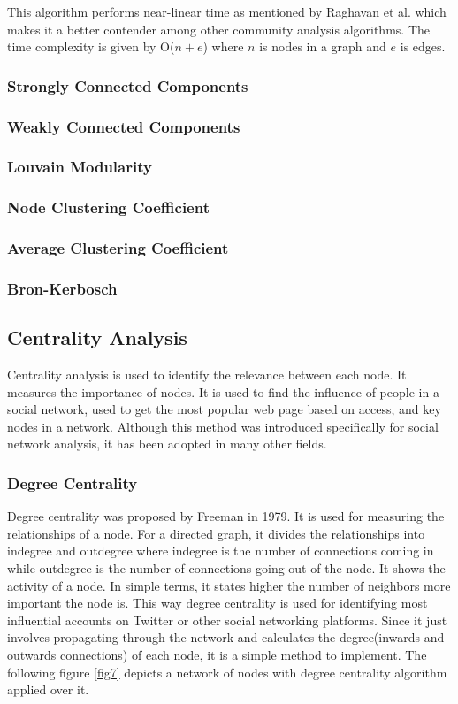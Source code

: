 \documentclass[journal,twoside,web]{ieeecolor}
\begin{document}
This algorithm performs near-linear time as mentioned by Raghavan et al.\cite{16} which makes it a better contender among other community analysis algorithms. The time complexity is given by O($n + e$) where $n$ is nodes in a graph and $e$ is edges.

\subsubsection{Strongly Connected Components}
\subsubsection{Weakly Connected Components}
\subsubsection{Louvain Modularity}
\subsubsection{Node Clustering Coefficient}
\subsubsection{Average Clustering Coefficient}
\subsubsection{Bron-Kerbosch}

\subsection{Centrality Analysis}
Centrality analysis is used to identify the relevance between each node. It measures the importance of nodes. It is used to find the influence of people in a social network, used to get the most popular web page based on access, and key nodes in a network. Although this method was introduced specifically for social network analysis, it has been adopted in many other fields.

\subsubsection{Degree Centrality}
Degree centrality was proposed by Freeman in 1979\cite{25}. It is used for measuring the relationships of a node. For a directed graph, it divides the relationships into indegree and outdegree where indegree is the number of connections coming in while outdegree is the number of connections going out of the node. It shows the activity of a node. In simple terms, it states higher the number of neighbors more important the node is. This way degree centrality is used for identifying most influential accounts on Twitter or other social networking platforms. Since it just involves propagating through the network and calculates the degree(inwards and outwards connections) of each node, it is a simple method to implement. The following figure \ref{fig7} depicts a network of nodes with degree centrality algorithm applied over it.
\end{document}

